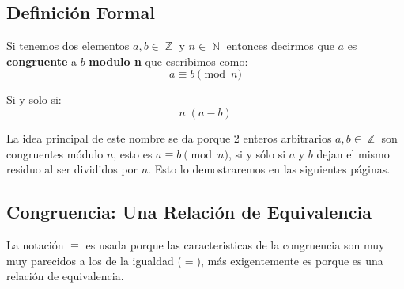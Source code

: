 \documentclass[12pt, fleqn]{report}                             %
\DeclareMathOperator \Naturals  {\mathbb{N}}                     %
\DeclareMathOperator \Integers  {\mathbb{Z}}                     %
\begin{document}
        \subsection*{Definición Formal}

            Si tenemos dos elementos $a, b \in \Integers$ y $n \in \Naturals$
            entonces decirmos que $a$ es \textbf{congruente} a $b$ \textbf{modulo n}
            que escribimos como:
            \begin{equation}
                a \equiv b \pmod{n}
            \end{equation}

            Si y solo si:
            \begin{equation}
                n | (a - b)
            \end{equation}


            La idea principal de este nombre se da porque 2 enteros arbitrarios
            $a,b \in \Integers$ son congruentes módulo $n$, esto es
            $a \equiv b \pmod{n}$, si y sólo si $a$ y $b$ dejan el mismo
            residuo al ser divididos por $n$. Esto lo demostraremos en las
            siguientes páginas.



        \clearpage
        \subsection{Congruencia: Una Relación de Equivalencia}

            La notación $\equiv$ es usada porque las caracteristicas de la
            congruencia son muy muy parecidos a los de la igualdad ($=$), 
            más exigentemente es porque es una relación de equivalencia.
\end{document}
